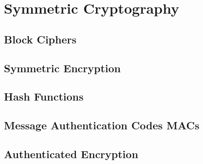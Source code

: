 
\section{Symmetric Cryptography}


\subsection{Block Ciphers}


\subsection{Symmetric Encryption}


\subsection{Hash Functions}


\subsection{Message Authentication Codes MACs}


\subsection{Authenticated Encryption}

